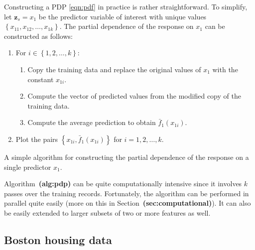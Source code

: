 \documentclass{article}
\def\ref#1{\textbf{(#1)}}
\begin{document}
Constructing a PDP \eqref{eqn:pdf} in practice is rather straightforward. To simplify, let $\boldsymbol{z}_s = x_1$ be the predictor variable of interest with unique values $\left\{x_{11}, x_{12}, \dots, x_{1k}\right\}$. The partial dependence of the response on $x_1$ can be constructed as follows:

\begin{algorithm}
\begin{enumerate}
  \item For $i \in \left\{1, 2, \dots, k\right\}$:
  \begin{enumerate}
    \item Copy the training data and replace the original values of $x_1$ with the constant $x_{1i}$.
    \item Compute the vector of predicted values from the modified copy of the training data.
    \item Compute the average prediction to obtain $\bar{f}_1\left(x_{1i}\right)$.
  \end{enumerate}
  \item Plot the pairs $\left\{x_{1i}, \bar{f}_1\left(x_{1i}\right)\right\}$ for $i = 1, 2, \dotsc, k$.
\end{enumerate}
\caption{A simple algorithm for constructing the partial dependence of the response on a single predictor $x_1$. \label{alg:pdp}}
\end{algorithm}
Algorithm~\ref{alg:pdp} can be quite computationally intensive since it involves $k$ passes over the training records. Fortunately, the algorithm can be performed in parallel quite easily (more on this in Section~\ref{sec:computational}). It can also be easily extended to larger subsets of two or more features as well.


\subsection{Boston housing data}
\end{document}
